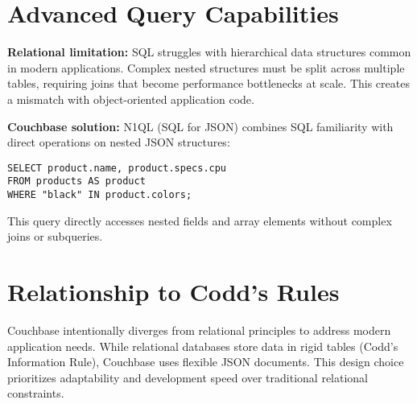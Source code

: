 \section{Advanced Query Capabilities}

\textbf{Relational limitation:} SQL struggles with hierarchical data structures common in modern applications. Complex nested structures must be split across multiple tables, requiring joins that become performance bottlenecks at scale. This creates a mismatch with object-oriented application code.

\textbf{Couchbase solution:} N1QL (SQL for JSON) combines SQL familiarity with direct operations on nested JSON structures:

\begin{verbatim}
SELECT product.name, product.specs.cpu
FROM products AS product
WHERE "black" IN product.colors;
\end{verbatim}

This query directly accesses nested fields and array elements without complex joins or subqueries.

\section{Relationship to Codd's Rules}

Couchbase intentionally diverges from relational principles to address modern application needs. While relational databases store data in rigid tables (Codd's Information Rule), Couchbase uses flexible JSON documents. This design choice prioritizes adaptability and development speed over traditional relational constraints.

